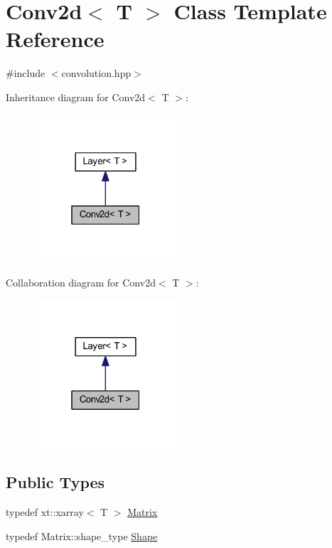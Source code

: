 \hypertarget{class_conv2d}{}\section{Conv2d$<$ T $>$ Class Template Reference}
\label{class_conv2d}


{\ttfamily \#include $<$convolution.\+hpp$>$}



Inheritance diagram for Conv2d$<$ T $>$\+:
\nopagebreak
\begin{figure}[H]
\begin{center}
\leavevmode
\includegraphics[width=151pt]{class_conv2d__inherit__graph}
\end{center}
\end{figure}


Collaboration diagram for Conv2d$<$ T $>$\+:
\nopagebreak
\begin{figure}[H]
\begin{center}
\leavevmode
\includegraphics[width=151pt]{class_conv2d__coll__graph}
\end{center}
\end{figure}
\subsection*{Public Types}
\begin{DoxyCompactItemize}
\item 
typedef xt\+::xarray$<$ T $>$ \mbox{\hyperlink{class_conv2d_a8263e2f2c46243e39fbca5712603c0fd}{Matrix}}
\item 
typedef Matrix\+::shape\+\_\+type \mbox{\hyperlink{class_conv2d_a78480f9c798b598a0bda9eadb1731225}{Shape}}
\end{DoxyCompactItemize}
